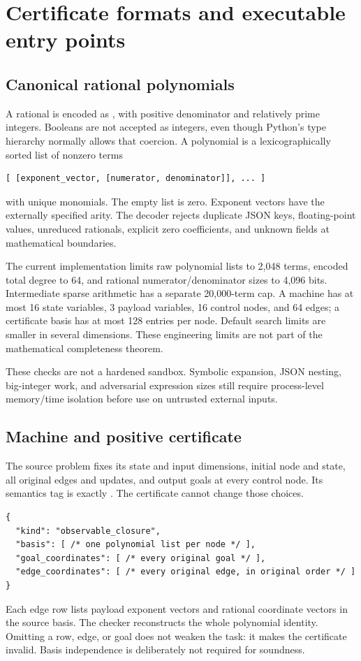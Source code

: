 \section{Certificate formats and executable entry points}
\label{app:formats}

\subsection{Canonical rational polynomials}
A rational is encoded as , with positive
 denominator and relatively prime integers. Booleans are not accepted as
integers, even though Python's type hierarchy normally allows that coercion.
A polynomial is a lexicographically sorted list of nonzero terms
\begin{lstlisting}
[ [exponent_vector, [numerator, denominator]], ... ]
\end{lstlisting}
with unique monomials. The empty list is zero. Exponent vectors have the
externally specified arity. The decoder rejects duplicate JSON keys,
floating-point values, unreduced rationals, explicit zero coefficients, and
unknown fields at mathematical boundaries.

The current implementation limits raw polynomial lists to 2,048 terms, encoded
total degree to 64, and rational numerator/denominator sizes to 4,096 bits.
Intermediate sparse arithmetic has a separate 20,000-term cap. A machine has
at most 16 state variables, 3 payload variables, 16 control nodes, and 64 edges;
a certificate basis has at most 128 entries per node. Default search limits
are smaller in several dimensions. These engineering limits are not part of
the mathematical completeness theorem.

These checks are not a hardened sandbox. Symbolic expansion, JSON nesting,
big-integer work, and adversarial expression sizes still require process-level
memory/time isolation before use on untrusted external inputs.

\subsection{Machine and positive certificate}
The source problem fixes its state and input dimensions, initial node and
state, all original edges and updates, and output goals at every control node.
Its semantics tag is exactly . The certificate
cannot change those choices.
\begin{lstlisting}
{
  "kind": "observable_closure",
  "basis": [ /* one polynomial list per node */ ],
  "goal_coordinates": [ /* every original goal */ ],
  "edge_coordinates": [ /* every original edge, in original order */ ]
}
\end{lstlisting}
Each edge row lists payload exponent vectors and rational coordinate vectors
in the source basis. The checker reconstructs the whole polynomial identity.
Omitting a row, edge, or goal does not weaken the task: it makes the certificate
invalid. Basis independence is deliberately not required for soundness.

